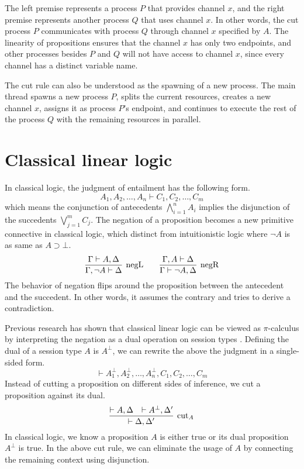 \documentclass[12pt, openany]{memoir}
\begin{document}
The left premise represents a process $P$ that provides channel $x$, and the right premise represents another process $Q$ that uses channel $x$. 
In other words, the cut process $P$ communicates with process $Q$ through channel $x$ specified by $A$. 
The linearity of propositions ensures that the channel $x$ has only two endpoints, 
and other processes besides $P$ and $Q$ will not have access to channel $x$, 
since every channel has a distinct variable name.

The cut rule can also be understood as the spawning of a new process. 
The main thread spawns a new process $P$, splits the current resources, creates a new channel $x$,
assigns it as process $P$'s endpoint, and continues to execute the rest of the process $Q$ with the remaining resources in parallel.
\section{Classical linear logic} \label{sec:cll}
In classical logic, the judgment of entailment has the following form.
\[
  A_1, A_2, \ldots, A_n \vdash C_1, C_2, \ldots, C_m
\]
which means the conjunction of antecedents $\bigwedge_{i = 1}^n A_i$ implies the disjunction of the succedents $\bigvee_{j = 1}^m C_j$.
The negation of a proposition becomes a new primitive connective in classical logic, which distinct from intuitionistic logic where $\neg A$ is as same as $A \supset \bot$.
\[
  \infer[\text{negL}]{\Gamma, \neg A \vdash \Delta}{\Gamma \vdash A, \Delta}
  \qquad
  \infer[\text{negR}]{\Gamma \vdash \neg A, \Delta}{\Gamma, A \vdash \Delta}
\]
The behavior of negation flips around the proposition between the antecedent and the succedent. 
In other words, it assumes the contrary and tries to derive a contradiction.

Previous research has shown that classical linear logic can be viewed as $\pi$-calculus
by interpreting the negation as a dual operation on session types \cite{Wadler2012}. 
Defining the dual of a session type $A$ is $A^{\bot}$, we can rewrite the above the judgment in a single-sided form.
\[
  \vdash A_1^\bot, A_2^\bot, \ldots, A_n^\bot, C_1, C_2, \ldots, C_m
\]
Instead of cutting a proposition on different sides of inference, we cut a proposition against its dual.
\[
  \infer[\text{cut}_A]{\vdash \Delta, \Delta'}{
    \vdash A, \Delta
    &
    \vdash A^\bot, \Delta'
  }
\]
In classical logic, we know a proposition $A$ is either true or its dual proposition $A^\bot$ is true.
In the above cut rule, we can eliminate the usage of $A$ by connecting the remaining context using disjunction. 
\end{document}
